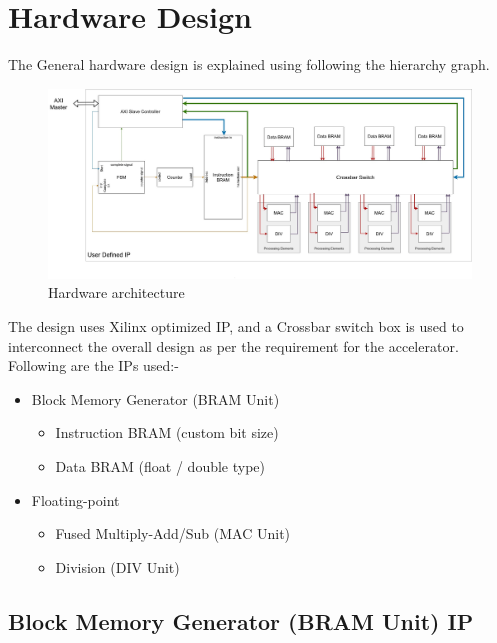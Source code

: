 \chapter{Hardware Design}
The General hardware design is explained using following the hierarchy graph.

\begin{figure}[H]
    \centering
    \includegraphics[width = \textwidth]{./Hardware/OWN_Hardware.jpg}
    \caption{Hardware architecture}
    \label{fig:sym:flowGraph}
\end{figure}


The design uses Xilinx optimized IP, and a Crossbar switch box is used to interconnect the overall design as per the requirement for the accelerator. Following are the IPs used:-
\begin{itemize}
	\item Block Memory Generator (BRAM Unit) \cite{Xilinx_BRAM}
		\begin{itemize}
		\item Instruction BRAM (custom bit size)
		\item Data BRAM (float / double type)
		\end{itemize}
	\item Floating-point \cite{Xilinx_Floatpt}
		\begin{itemize}
			\item Fused Multiply-Add/Sub (MAC Unit)
			\item Division (DIV Unit)
		\end{itemize}
\end{itemize}

\section{Block Memory Generator (BRAM Unit) IP}

